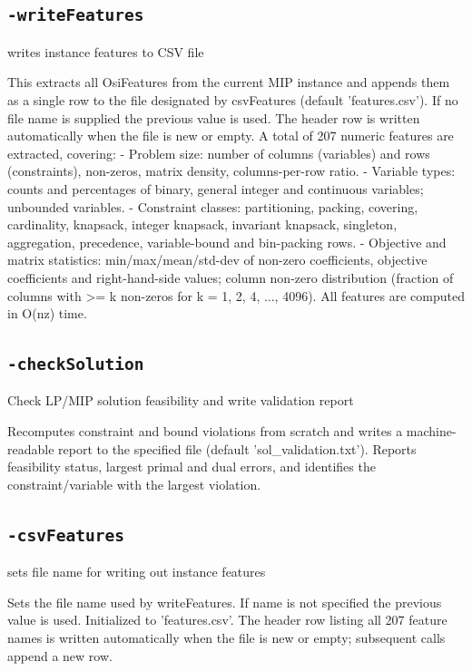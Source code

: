 \documentclass[11pt,a4paper]{article}
\begin{document}
\subsection*{\texttt{-writeFeatures}}

writes instance features to CSV file

This extracts all OsiFeatures from the current MIP instance and appends them as a single row to the file designated by csvFeatures (default 'features.csv'). If no file name is supplied the previous value is used. The header row is written automatically when the file is new or empty. A total of 207 numeric features are extracted, covering:
  - Problem size: number of columns (variables) and rows (constraints),
    non-zeros, matrix density, columns-per-row ratio.
  - Variable types: counts and percentages of binary, general integer
    and continuous variables; unbounded variables.
  - Constraint classes: partitioning, packing, covering, cardinality,
    knapsack, integer knapsack, invariant knapsack, singleton, aggregation,
    precedence, variable-bound and bin-packing rows.
  - Objective and matrix statistics: min/max/mean/std-dev of non-zero
    coefficients, objective coefficients and right-hand-side values;
    column non-zero distribution (fraction of columns with >= k non-zeros
    for k = 1, 2, 4, ..., 4096).
All features are computed in O(nz) time.

\subsection*{\texttt{-checkSolution}}

Check LP/MIP solution feasibility and write validation report

Recomputes constraint and bound violations from scratch and writes a machine-readable report to the specified file (default 'sol\_validation.txt'). Reports feasibility status, largest primal and dual errors, and identifies the constraint/variable with the largest violation.

\subsection*{\texttt{-csvFeatures}}

sets file name for writing out instance features

Sets the file name used by writeFeatures. If name is not specified the previous value is used. Initialized to 'features.csv'. The header row listing all 207 feature names is written automatically when the file is new or empty; subsequent calls append a new row.
\end{document}
